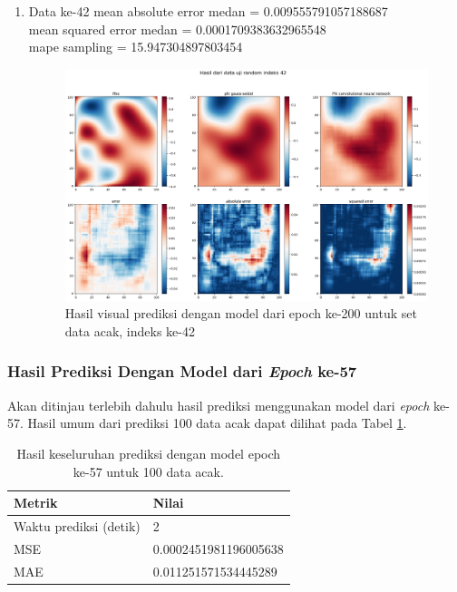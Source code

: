 \begin{enumerate}
    \item Data ke-42
    mean absolute error medan =  0.009555791057188687\\
    mean squared error medan = 0.0001709383632965548\\
    mape sampling =  15.947304897803454
    \begin{figure}[h!]
    \centering
    \includegraphics[width=12cm]{gambar/42_200_acak.png}
    \caption{Hasil visual prediksi dengan model dari epoch ke-200 untuk set data acak, indeks ke-42}
    \label{42_200_acak}
    \end{figure}
    
\end{enumerate}

\subsubsection{Hasil Prediksi Dengan Model dari \textit{Epoch} ke-57}
Akan ditinjau terlebih dahulu hasil prediksi menggunakan model dari \textit{epoch} ke-57. Hasil umum dari prediksi 100 data acak dapat dilihat pada Tabel \ref{57acak}.

\begin{table}[h!]
\centering
\caption{Hasil keseluruhan prediksi dengan model epoch ke-57 untuk 100 data acak.}
\label{57acak}
\begin{tabular}{ll}
\hline
\textbf{Metrik}        & \textbf{Nilai}         \\ \hline
Waktu prediksi (detik) & 2                      \\ \hline
MSE                    & 0.0002451981196005638 \\ \hline
MAE                    & 0.011251571534445289     \\ \hline
\end{tabular}
\end{table}

